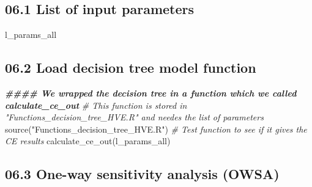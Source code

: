 \documentclass[
]{article}
\newenvironment{Shaded}{\begin{snugshade}}{\end{snugshade}}
\newcommand{\CommentTok}[1]{\textcolor[rgb]{0.56,0.35,0.01}{\textit{#1}}}
\newcommand{\DocumentationTok}[1]{\textcolor[rgb]{0.56,0.35,0.01}{\textbf{\textit{#1}}}}
\newcommand{\FunctionTok}[1]{\textcolor[rgb]{0.00,0.00,0.00}{#1}}
\newcommand{\NormalTok}[1]{#1}
\newcommand{\StringTok}[1]{\textcolor[rgb]{0.31,0.60,0.02}{#1}}
\begin{document}
\hypertarget{list-of-input-parameters}{%
\subsection{06.1 List of input
parameters}\label{list-of-input-parameters}}

\begin{Shaded}
\begin{Highlighting}[]
\NormalTok{l\_params\_all }
\end{Highlighting}
\end{Shaded}

\hypertarget{load-decision-tree-model-function}{%
\subsection{06.2 Load decision tree model
function}\label{load-decision-tree-model-function}}

\begin{Shaded}
\begin{Highlighting}[]
\DocumentationTok{\#\#\#\# We wrapped the decision tree in a function which we called calculate\_ce\_out }
\CommentTok{\# This function is stored in "Functions\_decision\_tree\_HVE.R" and needes the list of parameters}
\FunctionTok{source}\NormalTok{(}\StringTok{"Functions\_decision\_tree\_HVE.R"}\NormalTok{)}
\CommentTok{\# Test function to see if it gives the CE results}
\FunctionTok{calculate\_ce\_out}\NormalTok{(l\_params\_all)}
\end{Highlighting}
\end{Shaded}

\hypertarget{one-way-sensitivity-analysis-owsa}{%
\subsection{06.3 One-way sensitivity analysis
(OWSA)}\label{one-way-sensitivity-analysis-owsa}}
\end{document}
